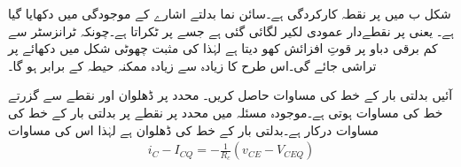 شکل  ب میں  پر  نقطہ کارکردگی ہے۔سائن نما بدلتے اشارے کے موجودگی میں  دکھایا گیا ہے۔ یعنی  پر نقطےدار عمودی لکیر لگائی گئی ہے جسے    پر ٹکراتا ہے۔چونکہ ٹرانزسٹر  سے کم برقی دباو پر قوتِ افزائش کھو دیتا ہے لہٰذا  کی مثبت چھوٹی شکل میں دکھائے  پر تراشی جائے گی۔اس طرح  کا زیادہ سے زیادہ ممکنہ حیطہ  کے برابر ہو گا۔

آئیں بدلتی بار کے خط کی مساوات حاصل کریں۔ محدد پر  ڈھلوان اور نقطے سے گزرتے خط کی مساوات  ہوتی ہے۔موجودہ مسئلہ میں  محدد پر نقطے پر بدلتی بار کے خط کی مساوات درکار ہے۔بدلتی بار کے خط کی ڈھلوان  ہے لہٰذا اس کی مساوات
\begin{align}\label{مساوات_ٹرانزسٹر_بدلتا_بار_خط_مساوات}
i_C-I_{CQ}=-\frac{1}{R_c} \left(v_{CE}-V_{CEQ} \right)
\end{align} 

